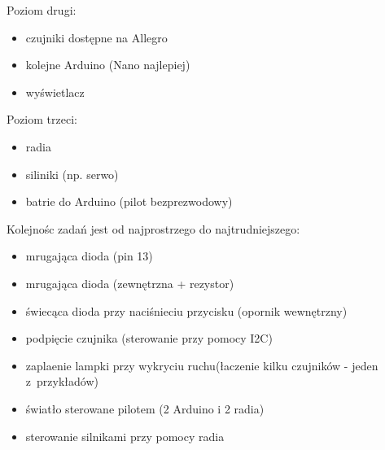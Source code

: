 Poziom drugi:
\begin{itemize}
\item czujniki dostępne na Allegro
\item kolejne Arduino (Nano najlepiej)
\item wyświetlacz
 \end{itemize}

Poziom trzeci:
\begin{itemize}
\item radia
\item siliniki (np. serwo)
\item batrie do Arduino (pilot bezprezwodowy)
\end{itemize}
        
Kolejnośc zadań jest od najprostrzego do najtrudniejszego:
 \begin{itemize}
\item mrugająca dioda (pin 13)
\item mrugająca dioda (zewnętrzna + rezystor)
\item świecąca dioda przy naciśnieciu przycisku (opornik wewnętrzny)
\item podpięcie czujnika (sterowanie przy pomocy I2C)
\item zaplaenie lampki przy wykryciu ruchu(łaczenie kilku czujników - jeden z~przykładów)
\item światło sterowane pilotem (2 Arduino i 2 radia)
\item sterowanie silnikami przy pomocy radia
 \end{itemize}
